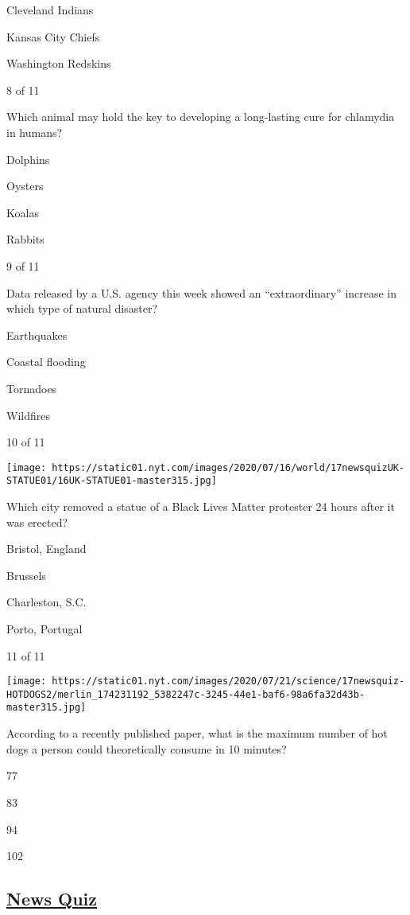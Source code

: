 Cleveland Indians

Kansas City Chiefs

Washington Redskins

8 of 11

Which animal may hold the key to developing a long-lasting cure for
chlamydia in humans?

Dolphins

Oysters

Koalas

Rabbits

9 of 11

Data released by a U.S. agency this week showed an ``extraordinary''
increase in which type of natural disaster?

Earthquakes

Coastal flooding

Tornadoes

Wildfires

10 of 11

\texttt{[image: https://static01.nyt.com/images/2020/07/16/world/17newsquizUK-STATUE01/16UK-STATUE01-master315.jpg]}

Which city removed a statue of a Black Lives Matter protester 24 hours
after it was erected?

Bristol, England

Brussels

Charleston, S.C.

Porto, Portugal

11 of 11

\texttt{[image: https://static01.nyt.com/images/2020/07/21/science/17newsquiz-HOTDOGS2/merlin\_174231192\_5382247c-3245-44e1-baf6-98a6fa32d43b-master315.jpg]}

According to a recently published paper, what is the maximum number of
hot dogs a person could theoretically consume in 10 minutes?

77

83

94

102

\hypertarget{news-quiz}{%
\subsection{\texorpdfstring{\href{https://www.nytimes.com/spotlight/news-quiz}{News
Quiz}}{News Quiz}}\label{news-quiz}}

